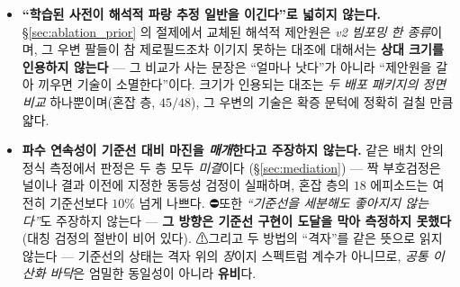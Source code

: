 \documentclass[11pt]{report}
\numberwithin{equation}{chapter}
\numberwithin{figure}{chapter}
\numberwithin{table}{chapter}
\begin{document}
\begin{itemize}
  \item \textbf{``학습된 사전이 해석적 파랑 추정 일반을 이긴다''로 넓히지 않는다.}
        \S\ref{sec:ablation_prior} 의 절제에서 교체된 해석적 제안원은 \emph{v2 빔포밍
        한 종류}이며, 그 우변 팔들이 참 제로필드조차 이기지 못하는 대조에 대해서는
        \textbf{상대 크기를 인용하지 않는다} --- 그 비교가 사는 문장은 ``얼마나 낫다''가
        아니라 ``제안원을 갈아 끼우면 기술이 소멸한다''이다. 크기가 인용되는 대조는
        \emph{두 배포 패키지의 정면 비교} 하나뿐이며(혼잡 층, $45/48$), 그 우변의 기술은
        확증 문턱에 정확히 걸칠 만큼 얇다.

  \item \textbf{파수 연속성이 기준선 대비 마진을 \emph{매개}한다고 주장하지 않는다.}
        같은 배치 안의 정식 측정에서 판정은 두 층 모두 \emph{미결}이다
        (\S\ref{sec:mediation}) --- 짝 부호검정은 널이나 결과 이전에 지정한 동등성
        검정이 실패하며, 혼잡 층의 $18$ 에피소드는 여전히 기준선보다 $10\%$ 넘게 나쁘다.
        ⛔또한 \emph{``기준선을 세분해도 좋아지지 않는다''}도 주장하지 않는다 ---
        \textbf{그 방향은 기준선 구현이 도달을 막아 측정하지 못했다}(대칭 검정의 절반이
        비어 있다). ⚠그리고 두 방법의 ``격자''를 같은 뜻으로 읽지 않는다 --- 기준선의
        상태는 격자 위의 \emph{장}이지 스펙트럼 계수가 아니므로, \emph{공통 이산화
        바닥}은 엄밀한 동일성이 아니라 \textbf{유비}다.


\end{itemize}
\end{document}
